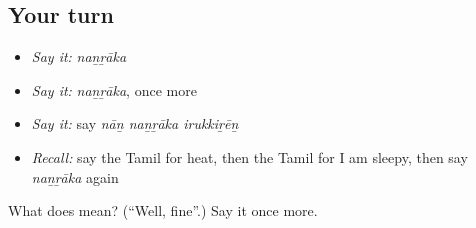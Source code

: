 \subsection*{Your turn}
\begin{itemize}
\raggedright
  \item \emph{Say it:} \emph{naṉṟāka}
  \item \emph{Say it:} \emph{naṉṟāka}, once more
  \item \emph{Say it:} say \emph{nāṉ naṉṟāka irukkiṟēṉ}
  \item \emph{Recall:} say the Tamil for heat, then the Tamil for I am sleepy, then say \emph{naṉṟāka} again
\end{itemize}

\begin{tcolorbox}[breakable,colback=teal!4,colframe=teal!35!black,title={Before you move on}]
What does  mean? (\textquotedblleft{}Well, fine\textquotedblright{}.) Say it once more.
\end{tcolorbox}
